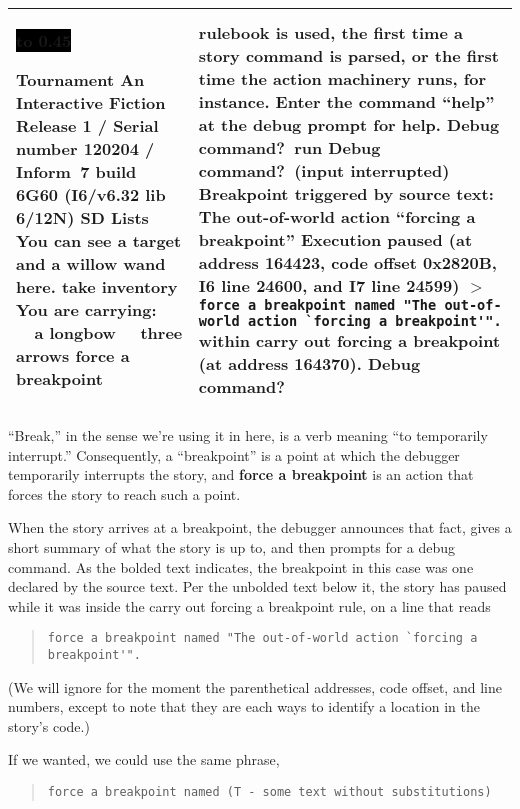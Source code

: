 \documentclass{book}
\newcommand{\n}{\hspace*{\fill}\newline}
\newcommand{\terp}[2]{\begin{center}\begin{tabular}{p{0.45\textwidth}|p{0.45\textwidth}}\midrule #1&#2\\\midrule\end{tabular}\end{center}}
\newcommand{\glkheading}[1]{\textbf{#1}}
\newcommand{\glkinput}[1]{\textbf{#1}}
\newcommand{\glkstatusline}[2]{\centerline{\colorbox{black}{\hbox to 0.45\textwidth{\textcolor{white}{#1\hfil #2}}}}}
\newcommand{\storyprompt}{\raisebox{1.5pt}{\(>\)}}
\newcommand{\cursor}{\raisebox{-1.5pt}{\RectangleThin}}
\newcommand{\markedindent}{\(>\)\qquad}
\begin{document}
\terp{\glkstatusline{Lists}{0/2}\n
  \glkheading{Tournament}\n
  An Interactive Fiction\n
  Release 1 / Serial number 120204 / Inform~7 build 6G60 (I6/v6.32 lib 6/12N) SD\n
  \n
  \glkheading{Lists}\n
  You can see a target and a willow wand here.\n
  \n
  \storyprompt\glkinput{take inventory}\n
  You are carrying:\n
  \null\ \ a longbow\n
  \null\ \ three arrows\n
  \n
  \storyprompt\glkinput{force a breakpoint}}{%
  rulebook is used, the first time a story command is parsed, or the first time the action machinery runs, for instance.\n
  \n
  Enter the command ``help'' at the debug prompt for help.\n
  \n
  Debug command?\ \glkinput{run}\n
  \n
  Debug command?\ (input interrupted)\n
  \glkheading{Breakpoint triggered by source text:} The out-of-world action ``forcing a breakpoint''\n
  \n
  Execution paused (at address 164423, code offset 0x2820B, I6 line 24600, and I7 line 24599)\n
  \markedindent \lstinline{force a breakpoint named "The out-of-world action `forcing a breakpoint'".}\n
  within carry out forcing a breakpoint (at address 164370).\n
  \n
  Debug command?\ \cursor}

``Break,'' in the sense we're using it in here, is a verb meaning ``to
temporarily interrupt.''  Consequently, a ``breakpoint'' is a point at which the
debugger temporarily interrupts the story, and \glkinput{force a breakpoint} is
an action that forces the story to reach such a point.

When the story arrives at a breakpoint, the debugger announces that fact, gives
a short summary of what the story is up to, and then prompts for a debug
command.  As the bolded text indicates, the breakpoint in this case was one
declared by the source text.  Per the unbolded text below it, the story has
paused while it was inside the carry out forcing a breakpoint rule, on a line
that reads

\begin{quote}
  \lstinline{force a breakpoint named "The out-of-world action `forcing a breakpoint'".}
\end{quote}

(We will ignore for the moment the parenthetical addresses, code offset, and
line numbers, except to note that they are each ways to identify a location in
the story's code.)

If we wanted, we could use the same phrase,

\begin{quote}
  \lstinline{force a breakpoint named (T - some text without substitutions)}
\end{quote}
\end{document}
